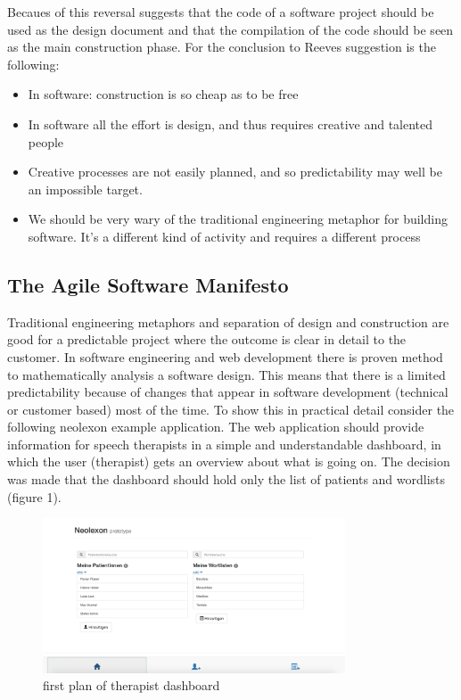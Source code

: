 Becaues of this reversal \cite{reeves1992software} suggests that the code of a software project should be used as the design document and that the compilation of the
code should be seen as the main construction phase. For \cite{fowler2001new} the conclusion to Reeves suggestion is the following:
\begin{itemize}
  \item In software: construction is so cheap as to be free
  \item In software all the effort is design, and thus requires creative and talented people
  \item Creative processes are not easily planned, and so predictability may well be an impossible target.
  \item We should be very wary of the traditional engineering metaphor for building software. It's a different kind of activity and requires a different process
\end{itemize} \cite{fowler2001new}

\newpage

\subsection{The Agile Software Manifesto}
Traditional engineering metaphors and separation of design and construction are good for a predictable project where the outcome is clear in
detail to the customer. In software engineering and web development there is proven method to mathematically analysis a software design. This means that there is
a limited predictability because of changes that appear in software development (technical or customer based) most of the time. To show this in practical detail
consider the following neolexon example application. The web application should provide information for speech therapists in a simple and understandable dashboard,
in which the user (therapist) gets an overview about what is going on. The decision was made that the dashboard should hold only the list of patients and wordlists (figure 1).

\begin{figure}[h!]
  \centering
  \includegraphics[width=0.8\textwidth]{images/patientsandlists.png}
  \caption{first plan of therapist dashboard}
\end{figure}


